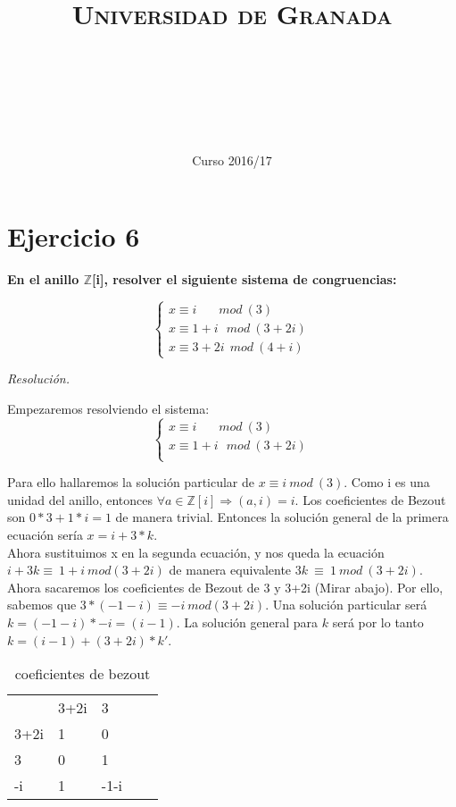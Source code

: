 \documentclass[11pt, a4paper, titlepage]{article}
\title{
  \normalfont \normalsize 
  \textsc{Universidad de Granada} \\ [25pt]    %
  \horrule{0.5pt} \\[0.4cm] %
  \huge \subject\\ %
  \horrule{2pt} \\[0.5cm] %
}
\author{\Large{\docauthor}}
\date{\vspace{-1.5em} \normalsize Curso 2016/17}
\begin{document}
\maketitle

\section{\LARGE{Ejercicio 6}}\textbf{
En el anillo $\mathbb{Z}$[i], resolver el siguiente sistema de congruencias:} 

\[
	\begin{cases}
	x \equiv i\ \ \ \ \ \ \ \ mod\ (3)\\
	x \equiv 1+i \ \ \ mod\ (3+2i)\\
	x \equiv 3+2i \ \ mod\ (4+i)
\end{cases}
\]

\emph{Resolución. \\ }

Empezaremos resolviendo el sistema: 
\[
	\begin{cases}
	x \equiv i\ \ \ \ \ \ \ \ mod\ (3)\\
	x \equiv 1+i \ \ \ mod\ (3+2i)\\
\end{cases}
\]

 Para ello hallaremos la solución particular de $x \equiv i\ mod\ (3)$. Como i es una unidad del anillo, entonces $\forall a \in \mathbb{Z}[i] \Rightarrow (a,i) = i.$ Los coeficientes de Bezout son $0*3 + 1*i = 1$ de manera trivial. Entonces la solución general de la primera ecuación sería $x = i + 3*k$. \\
 
 Ahora sustituimos x en la segunda ecuación, y nos queda la ecuación $i + 3k \equiv\ 1 +i\ mod (3+2i) $ de manera equivalente $3k\ \equiv\ 1\ mod\ (3+2i)$. Ahora sacaremos los coeficientes de Bezout de 3 y 3+2i (Mirar abajo). Por ello, sabemos que $3*(-1-i) \equiv -i\ mod (3+2i) $. Una solución particular será $k=(-1-i)*-i=(i-1)$. La solución general para $k$ será por lo tanto $k = (i-1) + (3+2i)*k'$. \\
 
  \begin{table}[]
\centering
\caption{coeficientes de bezout}
\label{my-label}
\begin{tabular}{lllll}
     & 3+2i & 3    &  &  \\
3+2i & 1    & 0    &  &  \\
3    & 0    & 1    &  &  \\
-i   & 1    & -1-i &  & 
\end{tabular}
\end{table}
 
\end{document}
